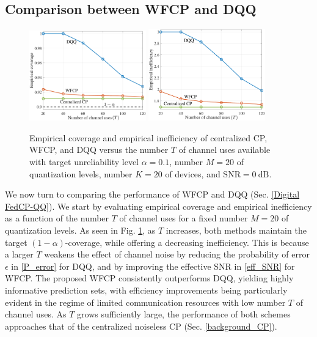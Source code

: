 \documentclass[12pt, draftclsnofoot, onecolumn]{IEEEtran}
\begin{document}
\subsection{Comparison between WFCP and DQQ}
\begin{figure}[t]
    \centering
    {
	\includegraphics[width = 0.45\textwidth]{./figures/cover_T.pdf}
	\includegraphics[width = 0.45\textwidth]{./figures/ineff_T.pdf}
	}
    \caption{Empirical coverage and empirical inefficiency of centralized CP, WFCP, and DQQ \cite{FedCP-QQ} versus the number $T$ of channel uses available with target unreliability level $\alpha=0.1$, number $M=20$ of quantization levels, number $K=20$ of devices, and $\text{SNR}=0~\text{dB}$.}
    \label{performance_R}
\end{figure}
We now turn to comparing the performance of WFCP and DQQ (Sec. \ref{Digital FedCP-QQ}). We start by evaluating empirical coverage and empirical inefficiency as a function of the number $T$ of channel uses for a fixed number $M = 20$ of quantization levels. As seen in Fig. \ref{performance_R}, as $T$ increases, both methods maintain the target $(1-\alpha)$-coverage, while offering a decreasing inefficiency. This is because a larger $T$ weakens the effect of channel noise by reducing the probability of error $\epsilon$ in \eqref{P_error} for DQQ, and by improving the effective SNR in \eqref{eff_SNR} for WFCP. The proposed WFCP consistently outperforms DQQ, yielding highly informative prediction sets, with efficiency improvements being particularly evident in the regime of limited communication resources with low number $T$ of channel uses. As $T$ grows sufficiently large, the performance of both schemes approaches that of the centralized noiseless CP (Sec. \ref{background_CP}).
\end{document}
